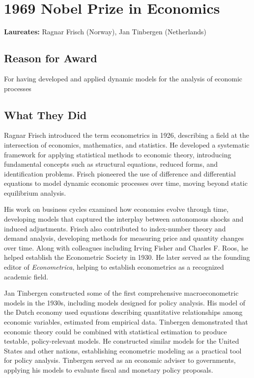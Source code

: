 \chapter{1969 Nobel Prize in Economics}
\textbf{Laureates: }Ragnar Frisch (Norway), Jan Tinbergen (Netherlands)

\section*{Reason for Award}
For having developed and applied dynamic models for the analysis of economic processes

\section{What They Did}
Ragnar Frisch introduced the term econometrics in 1926, describing a field at the intersection
of economics, mathematics, and statistics. He developed a systematic framework
for applying statistical methods to economic theory, introducing fundamental concepts such as
structural equations, reduced forms, and identification problems. Frisch pioneered the use of
difference and differential equations to model dynamic economic processes over time, moving beyond
static equilibrium analysis.

His work on business cycles examined how economies evolve through time, developing models that
captured the interplay between autonomous shocks and induced adjustments. Frisch also contributed
to index-number theory and demand analysis, developing methods for measuring price and quantity
changes over time. Along with colleagues including Irving Fisher and Charles F. Roos, he helped
establish the Econometric Society in 1930. He later served as the founding editor of
\textit{Econometrica}, helping to establish econometrics as a recognized academic field.

Jan Tinbergen constructed some of the first comprehensive macroeconometric models in the 1930s,
including models designed for policy analysis. His model of the Dutch economy used equations
describing quantitative relationships among economic variables, estimated from empirical data.
Tinbergen demonstrated that economic theory could be combined with statistical estimation to
produce testable, policy-relevant models. He constructed similar models for the United States
and other nations, establishing econometric modeling as a practical tool for policy analysis.
Tinbergen served as an economic adviser to governments, applying his models to evaluate fiscal
and monetary policy proposals.

